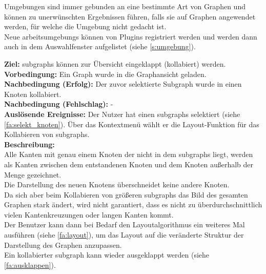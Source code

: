 Umgebungen sind immer gebunden an eine bestimmte Art von Graphen und können zu unerwünschten Ergebnissen führen, falls sie auf Graphen angewendet werden, für welche die Umgebung nicht gedacht ist.\\
Neue \glspl{arbeitsumgebung} können von Plugins registriert werden und werden dann auch in dem Auswahlfenster aufgelistet (siehe \ref{s:umgebung}).


\label{fa:kollabieren}
\textbf{Ziel:} \glspl{subgraph} können zur Übersicht eingeklappt (kollabiert) werden.\\
\textbf{Vorbedingung:} Ein Graph wurde in die Graphansicht geladen.\\
\textbf{Nachbedingung (Erfolg):} Der zuvor selektierte Subgraph wurde in einen Knoten kollabiert.\\
\textbf{Nachbedingung (Fehlschlag):} -\\
\textbf{Auslösende Ereignisse:} Der Nutzer hat einen \glspl{subgraph} selektiert (siehe \ref{fa:selekt_knoten}).
Über das Kontextmenü wählt er die Layout-Funktion für das Kollabieren von \glspl{subgraph}.\\
\textbf{Beschreibung:}\\
Alle Kanten mit genau einem Knoten der nicht in dem \glspl{subgraph} liegt, werden als Kanten zwischen dem entstandenen Knoten und dem Knoten außerhalb der Menge gezeichnet.\\
Die Darstellung des neuen Knotens überschneidet keine andere Knoten.\\
Da sich aber beim Kollabieren von größeren \glspl{subgraph} das Bild des gesamten Graphen stark ändert, wird nicht garantiert,
dass es nicht zu überdurchschnittlich vielen Kantenkreuzungen oder langen Kanten kommt.\\
Der Benutzer kann dann bei Bedarf den Layoutalgorithmus ein weiteres Mal ausführen (siehe \ref{fa:layout}), um das Layout auf die
veränderte Struktur der Darstellung des Graphen anzupassen.\\
Ein kollabierter \gls{subgraph} kann wieder ausgeklappt werden (siehe \ref{fa:ausklappen}).


